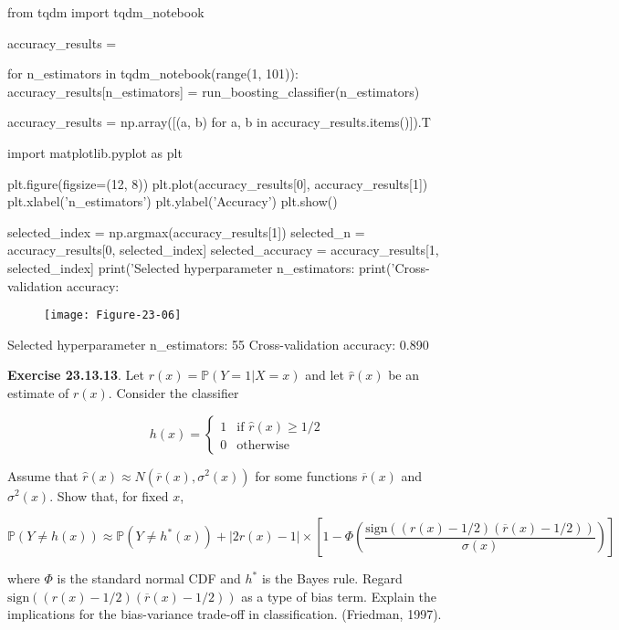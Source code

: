 \begin{python}
from tqdm import tqdm_{n}otebook

accuracy_results = {}

for n_estimators in tqdm_{n}otebook(range(1, 101)):
    accuracy_results[n_estimators] = run_boosting_classifier(n_estimators)
    
accuracy_results = np.array([(a, b) for a, b in accuracy_results.items()]).T
\end{python}

\begin{python}
import matplotlib.pyplot as plt

plt.figure(figsize=(12, 8))
plt.plot(accuracy_results[0], accuracy_results[1])
plt.xlabel('n_estimators')
plt.ylabel('Accuracy')
plt.show()

selected_{i}ndex = np.argmax(accuracy_results[1])
selected_{n} = accuracy_results[0, selected_{i}ndex]
selected_accuracy = accuracy_results[1, selected_{i}ndex]
print('Selected hyperparameter n_estimators: %
print('Cross-validation accuracy: %
\end{python}

\begin{figure}[H]
\centering
\texttt{[image: Figure-23-06]}
\end{figure}

\begin{console}
Selected hyperparameter n\_estimators: 55
Cross-validation accuracy: 0.890
\end{console}

\textbf{Exercise 23.13.13}. Let \(r(x) = \mathbb{P}(Y = 1 | X = x)\) and
let \(\hat{r}(x)\) be an estimate of \(r(x)\). Consider the classifier

\[
h(x) = \begin{cases}
1 &\text{if } \hat{r}(x) \geq 1/2 \\
0 &\text{otherwise}
\end{cases}
\]

Assume that \(\hat{r}(x) \approx N(\overline{r}(x), \sigma^{2}(x))\) for
some functions \(\overline{r}(x)\) and \(\sigma^{2}(x)\). Show that, for
fixed \(x\),

\[ \mathbb{P}(Y \neq h(x)) \approx \mathbb{P}(Y \neq h^*(x)) + 
\left| 2 r(x) - 1 \right| \times \left[ 1 - \Phi \left( \frac{\text{sign} \left( (r(x) - 1/2) (\overline{r}(x) - 1/2) \right)}{\sigma(x)} \right) \right]\]

where \(\Phi\) is the standard normal CDF and \(h^*\) is the Bayes rule.
Regard
\(\text{sign} \left( (r(x) - 1/2) (\overline{r}(x) - 1/2) \right)\) as a
type of bias term. Explain the implications for the bias-variance
trade-off in classification. (Friedman, 1997).

